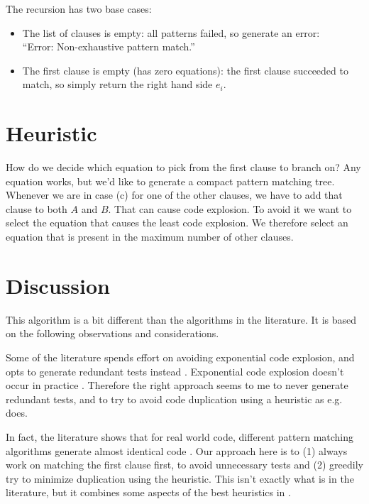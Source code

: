 \documentclass[a4paper, 11pt]{article}
\theoremstyle{definition}
\begin{document}
\noindent The recursion has two base cases:
\begin{itemize}
  \item The list of clauses is empty: all patterns failed, so generate an error:\\ ``Error: Non-exhaustive pattern match.''
  \item The first clause is empty (has zero equations): the first clause succeeded to match, so simply return the right hand side $e_i$.
\end{itemize}

\section{Heuristic}

How do we decide which equation to pick from the first clause to branch on? Any equation works, but we'd like to generate a compact pattern matching tree. Whenever we are in case (c) for one of the other clauses, we have to add that clause to both $A$ and $B$. That can cause code explosion. To avoid it we want to select the equation that causes the least code explosion. We therefore select an equation that is present in the maximum number of other clauses.

\section{Discussion}

This algorithm is a bit different than the algorithms in the literature. It is based on the following observations and considerations.

Some of the literature spends effort on avoiding exponential code explosion, and opts to generate redundant tests instead \cite{augustsson_compiling_1985}. Exponential code explosion doesn't occur in practice \cite{scott_when_2000}. Therefore the right approach seems to me to never generate redundant tests, and to try to avoid code duplication using a heuristic as e.g. \cite{maranget_compiling_2008} does.

In fact, the literature shows that for real world code, different pattern matching algorithms generate almost identical code \cite{scott_when_2000,maranget_compiling_2008}. Our approach here is to (1) always work on matching the first clause first, to avoid unnecessary tests and (2) greedily try to minimize duplication using the heuristic. This isn't exactly what is in the literature, but it combines some aspects of the best heuristics in \cite{maranget_compiling_2008}.
\end{document}
